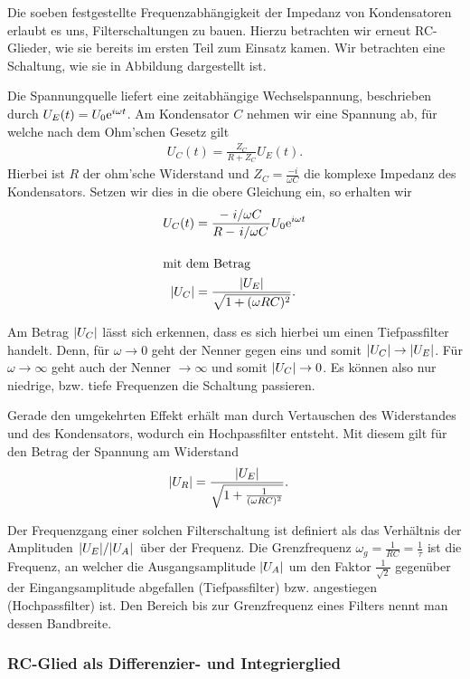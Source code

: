 Die soeben festgestellte Frequenzabhängigkeit der Impedanz von Kondensatoren erlaubt es uns, Filterschaltungen zu bauen. Hierzu betrachten wir erneut RC-Glieder, wie sie bereits im ersten Teil zum Einsatz kamen. Wir betrachten eine Schaltung, wie sie in Abbildung  dargestellt ist.

Die Spannungquelle liefert eine zeitabhängige Wechselspannung, beschrieben durch $U_E(t) = U_0 \text{e}^{i\omega t}$. Am Kondensator $C$ nehmen wir eine Spannung ab, für welche nach dem Ohm'schen Gesetz gilt
\begin{align}
  U_C(t) = \frac{Z_C}{R + Z_C} U_E(t).
\end{align}
Hierbei ist $R$ der ohm'sche Widerstand und $Z_C = \frac{-i}{\omega C}$ die komplexe Impedanz des Kondensators. Setzen wir dies in die obere Gleichung ein, so erhalten wir
\begin{align}
  U_C(t) &= \frac{-\ffrac{i}{\omega C}}{R - \ffrac{i}{\omega C}} U_0 \e{i \omega t}\\[1em]
  \intertext{mit dem Betrag}
  \qty|U_C| &= \frac{\qty|U_E|}{\sqrt{1 + (\omega R C)^2}}. \label{eq:ampl_tp}
\end{align}

Am Betrag $\qty|U_C|$ lässt sich erkennen, dass es sich hierbei um einen Tiefpassfilter handelt. Denn, für $\omega \to 0$ geht der Nenner gegen eins und somit $\qty|U_C| \to \qty|U_E|$. Für $\omega \to \infty$ geht auch der Nenner $\to \infty$ und somit $\qty|U_C| \to 0$. Es können also nur niedrige, bzw. tiefe Frequenzen die Schaltung passieren.

Gerade den umgekehrten Effekt erhält man durch Vertauschen des Widerstandes und des Kondensators, wodurch ein Hochpassfilter entsteht. Mit diesem gilt für den Betrag der Spannung am Widerstand
\begin{align}
  \qty|U_R| &= \frac{\qty|U_E|}{\sqrt{1 + \frac{1}{(\omega R C)^2}}}.\label{eq:ampl_hp}
\end{align}

Der Frequenzgang einer solchen Filterschaltung ist definiert als das Verhältnis der Amplituden $\ffrac{\qty|U_E|}{\qty|U_A|}$ über der Frequenz. Die Grenzfrequenz $\omega_g = \frac{1}{RC} = \frac{1}{\tau}$ ist die Frequenz, an welcher die Ausgangsamplitude $\qty|U_A|$ um den Faktor $\frac{1}{\sqrt{2}}$ gegenüber der Eingangsamplitude abgefallen (Tiefpassfilter) bzw. angestiegen (Hochpassfilter) ist. Den Bereich bis zur Grenzfrequenz eines Filters nennt man dessen Bandbreite.

\subsubsection*{RC-Glied als Differenzier- und Integrierglied}

